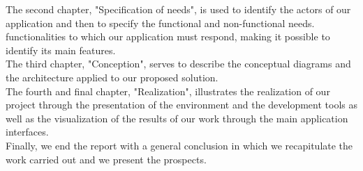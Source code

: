 The second chapter, "Specification of needs", is used to identify the actors of our application and then to specify the functional and non-functional needs.
functionalities to which our application must respond, making it possible to identify
its main features.\\
The third chapter, "Conception", serves to describe the conceptual diagrams and the architecture applied to our proposed solution.\\
The fourth and final chapter, "Realization", illustrates the realization
of our project through the presentation of the environment and the development tools as well as the visualization of the results of our work through
the main application interfaces.\\
Finally, we end the report with a general conclusion in which
we recapitulate the work carried out and we present the prospects.

